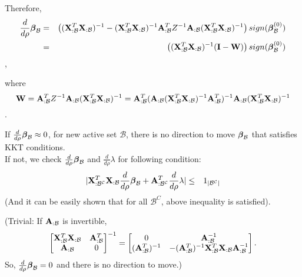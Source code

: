 \documentclass{article}
\newcommand{\bA}{{\bf A}}
\newcommand{\bX}{{\bf X}}
\newcommand{\bW}{{\bf W}}
\newcommand{\bI}{{\bf I}}
\newcommand{\bbeta}{\mbox{\boldmath{$\beta$}}}
\newcommand{\bea}{\begin{eqnarray}}
\newcommand{\eea}{\end{eqnarray}}
\begin{document}
Therefore,
\bea
\frac{d}{d\rho}\bbeta_{\mathcal{B}} &=& \left( (\bX_{:\mathcal{B}}^T \bX_{:\mathcal{B}})^{-1} - (\bX_{:\mathcal{B}}^T \bX_{:\mathcal{B}})^{-1} \bA_{:\mathcal{B}}^T Z^{-1} \bA_{:\mathcal{B}} (\bX_{:\mathcal{B}}^T \bX_{:\mathcal{B}})^{-1} \right) sign(\bbeta_{\mathcal{B}}^{(0)}) \nonumber \\
&=& \left( (\bX_{:\mathcal{B}}^T \bX_{:\mathcal{B}})^{-1}(\bI - \bW) \right) sign(\bbeta_{\mathcal{B}}^{(0)})
\eea,

where $$\bW = \bA_{:\mathcal{B}}^T Z^{-1} \bA_{:\mathcal{B}} (\bX_{:\mathcal{B}}^T \bX_{:\mathcal{B}})^{-1} = \bA_{:\mathcal{B}}^T (\bA_{:\mathcal{B}} (\bX_{:\mathcal{B}}^T \bX_{:\mathcal{B}})^{-1} \bA_{:\mathcal{B}}^T)^{-1} \bA_{:\mathcal{B}} (\bX_{:\mathcal{B}}^T \bX_{:\mathcal{B}})^{-1}$$.

If $\frac{d}{d\rho}\bbeta_{\mathcal{B}} \approx 0$, for new active set $\mathcal{B}$, there is no direction to move $\bbeta_{\mathcal{B}}$ that satisfies KKT conditions. \\
If not, we check $\frac{d}{d\rho}\bbeta_{\mathcal{B}}$ and $\frac{d}{d\rho}\lambda$ for following condition:
\bea
\lvert \bX_{:\mathcal{B^C}}^T \bX_{:\mathcal{B}} \frac{d}{d\rho}\bbeta_{\mathcal{B}} + \bA_{:\mathcal{B^C}}^T \frac{d}{d\rho}\lambda \rvert &\leq& 1_{|\mathcal{B^C}|}
\eea
(And it can be easily shown that for all $\mathcal{B}^C$, above inequality is satisfied). 

\bigskip
(Trivial: If $\bA_{:\mathcal{B}}$ is invertible, 
\bea
\begin{bmatrix} 
\bX_{:\mathcal{B}}^T \bX_{:\mathcal{B}} & \bA_{:\mathcal{B}}^T  \\
\bA_{:\mathcal{B}} & 0
\end{bmatrix}^{-1}
=
\begin{bmatrix} 
0 & \bA_{:\mathcal{B}}^{-1}  \\
(\bA_{:\mathcal{B}}^T)^{-1} & - (\bA_{:\mathcal{B}}^T)^{-1} \bX_{:\mathcal{B}}^T \bX_{:\mathcal{B}} \bA_{:\mathcal{B}}^{-1} 
\end{bmatrix}.
\eea
So, $\frac{d}{d\rho}\bbeta_{\mathcal{B}} = 0$ and there is no direction to move.)
\end{document}
